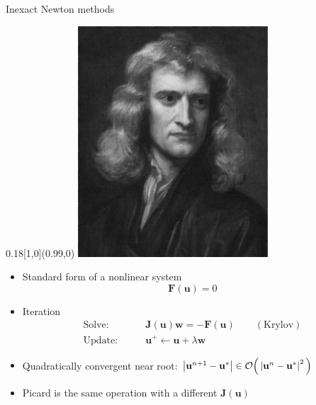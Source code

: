\documentclass{beamer}
\newcommand{\vu}{\mathbf{u}}
\newcommand{\vw}{\mathbf{w}}
\newcommand{\vF}{\mathbf{F}}
\newcommand{\vJ}{\mathbf{J}}
\begin{document}
\begin{frame}{Inexact Newton methods}
  \begin{textblock}{0.18}[1,0](0.99,0)
    \includegraphics[width=\textwidth]{figures/Newton}
  \end{textblock}
  \begin{itemize}
  \item Standard form of a nonlinear system
    \[ \vF(\vu) = 0 \]
  \item Iteration
    \begin{align*}
      \text{Solve:} & \qquad \vJ(\vu) \vw = -\vF(\vu) \qquad (\text{Krylov}) \\
      \text{Update:} & \qquad \vu^+ \gets \vu + \lambda \vw
    \end{align*}
    \item Quadratically convergent near root: $\abs{\vu^{n+1}-\vu^*} \in \bigO\Big(\abs{\vu^n-\vu^*}^2\Big)$
    \item Picard is the same operation with a different $\vJ(\vu)$
  \end{itemize}

\end{frame}
\end{document}
